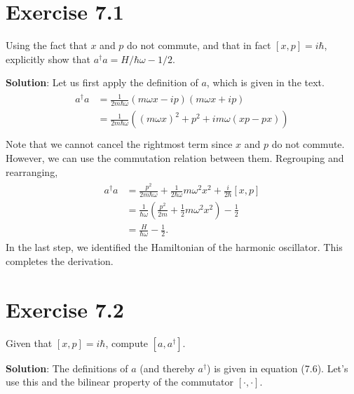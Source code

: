 \documentclass{book}
\begin{document}
\section*{Exercise 7.1}
    Using the fact that $x$ and $p$ do not commute, and that in fact $[x,p]=i\hbar$, explicitly show that $a^\dagger a= H/\hbar\omega -1/2$.
    
    \textbf{Solution}: Let us first apply the definition of $a$, which is given in the text.
    \begin{align}
    \begin{aligned}
        a^\dagger a &= \frac{1}{2m\hbar\omega}(m\omega x-ip)(m\omega x+ip) \\
        &= \frac{1}{2m\hbar\omega} \left((m\omega x)^2 + p^2 + im\omega(xp-px)\right) \\
    \end{aligned}
    \end{align}
    Note that we cannot cancel the rightmost term since $x$ and $p$ do not commute. However, we can use the commutation relation between them. Regrouping and rearranging,
    \begin{align}
    \begin{aligned}
        a^\dagger a &= \frac{p^2}{2m\hbar\omega}+\frac{1}{2\hbar\omega}m \omega^2 x^2 + \frac{i}{2\hbar} [x,p] \\
        &= \frac{1}{\hbar\omega} \left(\frac{p^2}{2m} + \frac{1}{2}m\omega^2 x^2\right) - \frac{1}{2} \\
        &= \frac{H}{\hbar\omega}-\frac{1}{2}.
    \end{aligned}
    \end{align}
    In the last step, we identified the Hamiltonian of the harmonic oscillator. This completes the derivation.
    
\section*{Exercise 7.2}
    Given that $[x,p] = i\hbar$, compute $[a, a^\dagger]$.

    \textbf{Solution}: The definitions of $a$ (and thereby $a^\dagger$) is given in equation (7.6). Let's use this and the bilinear property of the commutator $[\cdot, \cdot]$.
\end{document}
